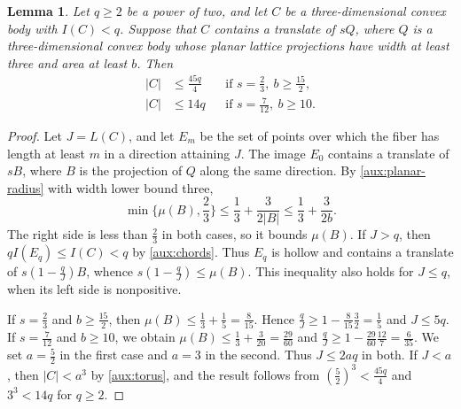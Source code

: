 \documentclass[reqno, 11pt]{article}
\numberwithin{equation}{section}
\newtheorem{lemma}[lemma]{Lemma}
\theoremstyle{definition}
\begin{document}
\begin{lemma}\label{lem:short-layer}
Let $q\ge2$ be a power of two, and let $C$ be a three-dimensional
convex body with $I(C)<q$. Suppose that $C$ contains a translate
of $sQ$, where $Q$ is a three-dimensional convex body whose planar
lattice projections have width at least three and area at least $b$.
Then
\[
 \begin{aligned}
 |C|&\le \frac{45q}{4} &&\text{if }s=\frac{2}{3},\ b\ge\frac{15}{2},\\
 |C|&\le 14q   &&\text{if }s=\frac{7}{12},\ b\ge10 .
 \end{aligned}
\]
\end{lemma}

\begin{proof}
Let $J=L(C)$, and let $E_m$ be the set of points over which the
fiber has length at least $m$ in a direction attaining $J$. The image
$E_0$ contains a translate of $sB$, where $B$ is the projection of $Q$
along the same direction. By \eqref{aux:planar-radius} with width
lower bound three,
\[
 \min\{\mu(B),\frac{2}{3}\}\le\frac{1}{3}+\frac{3}{2|B|}
                         \le\frac{1}{3}+\frac{3}{2b}.
\]
The right side is less than $\frac{2}{3}$ in both cases, so it
bounds $\mu(B)$. If $J>q$, then $qI(E_q)\le I(C)<q$
by \cref{aux:chords}. Thus $E_q$ is hollow and contains a translate
of $s(1-\frac{q}{J})B$, whence $s(1-\frac{q}{J})\le\mu(B)$.
This inequality also holds for $J\le q$, when its left side is nonpositive.

If $s=\frac{2}{3}$ and $b\ge\frac{15}{2}$, then
$\mu(B)\le\frac{1}{3}+\frac{1}{5}=\frac{8}{15}$. Hence
$\frac{q}{J}\ge1-\frac{8}{15}\frac{3}{2}=\frac{1}{5}$ and $J\le5q$.
If $s=\frac{7}{12}$ and $b\ge10$, we obtain
$\mu(B)\le\frac{1}{3}+\frac{3}{20}=\frac{29}{60}$ and
$\frac{q}{J}\ge1-\frac{29}{60}\frac{12}{7}=\frac{6}{35}$.
We set $a=\frac{5}{2}$ in the first case and $a=3$ in the second.
Thus $J\le2aq$ in both. If $J<a$, then $|C|<a^3$ by \cref{aux:torus}, and the result follows from
$(\frac{5}{2})^3<\frac{45q}{4}$ and $3^3<14q$ for $q\ge2$.


\end{proof}
\end{document}
